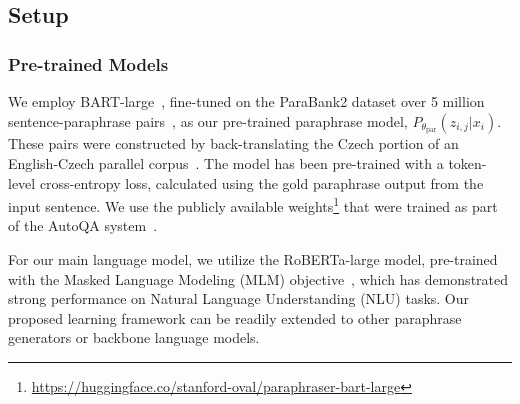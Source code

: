 \documentclass[11pt]{article}
\begin{document}
\subsection{Setup}
\subsubsection{Pre-trained Models}
We employ BART-large~\cite{lewis-etal-2020-bart}, fine-tuned on the ParaBank2 dataset over 5 million sentence-paraphrase pairs~\cite{hu-etal-2019-large}, as our pre-trained paraphrase model, $P_{\theta_{\text{par}}} (z_{i,j} | x_{i})$. These pairs were constructed by back-translating the Czech portion of an English-Czech parallel corpus~\cite{hu-etal-2019-large}. The model has been pre-trained with a token-level cross-entropy loss, calculated using the gold paraphrase output from the input sentence. We use the publicly available weights\footnote{\url{https://huggingface.co/stanford-oval/paraphraser-bart-large}} that were trained as part of the AutoQA system~\cite{xu-etal-2020-autoqa}.

\begin{comment}
It is worth noting that our goal is not to train a state-of-the-art paraphrase generator, but to study the impact of paraphrasing on prompt optimization techniques. Recent techniques for generating diverse paraphrases~\cite{zhou-bhat-2021-paraphrase} could enhance performance in all our experiments. Given that some of our classification experiments were conducted on the GLUE benchmark~\cite{DBLP:journals/corr/abs-1804-07461}, we opted for the BART-based model over the T5 pre-trained model. This decision was made because the GLUE dataset was part of the supervised corpora used for pre-training T5 models~\cite{DBLP:journals/corr/abs-1910-10683}. Moreover, the BART-large model, fine-tuned on the paraphrase corpus, has not encountered the input sentences and corresponding class labels of the GLUE datasets in its initial pre-training dataset.
\end{comment}

For our main language model, we utilize the RoBERTa-large model, pre-trained with the Masked Language Modeling (MLM) objective~\cite{DBLP:journals/corr/abs-1907-11692}, which has demonstrated strong performance on Natural Language Understanding (NLU) tasks. Our proposed learning framework can be readily extended to other paraphrase generators or backbone language models.
\end{document}
